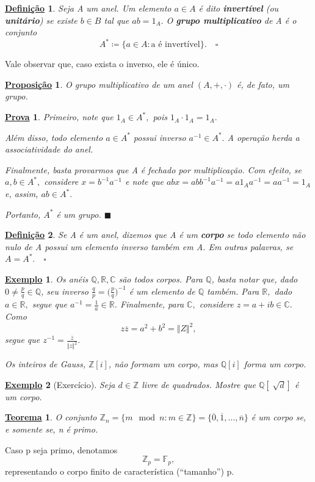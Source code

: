 \documentclass{article}
\newtheorem*{def*}{\underline{Defini\c c\~ao}}
\newtheorem*{theorem*}{\underline{Teorema}}
\newtheorem*{prop*}{\underline{Proposi\c c\~ao}}
\newtheorem{example}{\underline{Exemplo}}
\newtheorem*{proof*}{\underline{Prova}}
\renewcommand\qedsymbol{$\blacksquare$}
\begin{document}
\begin{def*}
  Seja A um anel. Um elemento \(a\in A\) é dito \textbf{invertível} (ou \textbf{unitário}) se existe \(b\in B\) tal que \(ab = 1_{A}.\) O \textbf{grupo multiplicativo} de A
  é o conjunto 
  \[
    A^{*}\coloneqq \{a\in A: \text{a é invertível}\}.\quad\square
  \]
\end{def*}
Vale observar que, caso exista o inverso, ele é único.
\begin{prop*}
  O grupo multiplicativo de um anel \((A, +, \cdot )\) é, de fato, um grupo.
\end{prop*}
\begin{proof*}
  Primeiro, note que \(1_{A}\in A^{*},\) pois \(1_{A} \cdot 1_{A} = 1_{A}.\) 

  Além disso, todo elemento \(a\in A^{*}\) possui inverso \(a^{-1}\in A^{*}.\) A operação herda a associatividade do anel. 

  Finalmente, basta provarmos que A é fechado por multiplicação. Com efeito, se \(a, b\in A^{*},\) considere \(x = b^{-1}a^{-1}\) e note que \(abx = abb^{-1}a^{-1} =
  a 1_{A} a^{-1} = aa^{-1} = 1_{A}\) e, assim, \(ab\in A^{*}.\)

  Portanto, \(A^{*}\) é um grupo. \qedsymbol
\end{proof*}
\begin{def*}
  Se A é um anel, dizemos que A é um \textbf{corpo} se todo elemento não nulo de A possui um elemento inverso também em A. Em outras palavras, se \(A = A^{*}.\quad\square\)
\end{def*}
\begin{example}
  Os anéis \(\mathbb{Q}, \mathbb{R}, \mathbb{C}\) são todos corpos. Para \(\mathbb{Q}\), basta notar que, dado \(0\neq \frac{p}{q}\in \mathbb{Q}\), seu inverso
 \(\frac{q}{p} = \biggl(\frac{p}{q}\biggr)^{-1}\) é um elemento de \(\mathbb{Q}\) também. Para \(\mathbb{R},\) dado \(a\in \mathbb{R},\) segue que \(a^{-1} = \frac{1}{a}\in \mathbb{R}\).
 Finalmente, para \(\mathbb{C},\) considere \(z = a + ib\in \mathbb{C}.\) Como 
   \[
     z\overline{z} = a^{2} + b^{2} = \Vert Z \Vert^{2},
   \]
  segue que \(z^{-1}=\frac{\overline{z}}{\Vert z \Vert^{2}}.\)

  Os inteiros de Gauss, \(\mathbb{Z}[i]\), não formam um corpo, mas \(\mathbb{Q}[i]\) forma um corpo. 
\end{example}
\begin{example}[Exercício]
  Seja \(d\in \mathbb{Z}\) livre de quadrados. Mostre que \(\mathbb{Q}[\sqrt[]{d}]\) é um corpo.
\end{example}
\begin{theorem*}
  O conjunto \(\mathbb{Z}_{n} = \{m\mod n: m\in \mathbb{Z}\} = \{\overline{0}, \overline{1}, \dotsc , \overline{n}\}\) é um corpo se, e somente se, n é primo.
\end{theorem*}
  Caso p seja primo, denotamos 
  \[
    \mathbb{Z}_{p} = \mathbb{F}_{p},
  \]
  representando o corpo finito de característica (``tamanho'') p.
\end{document}

